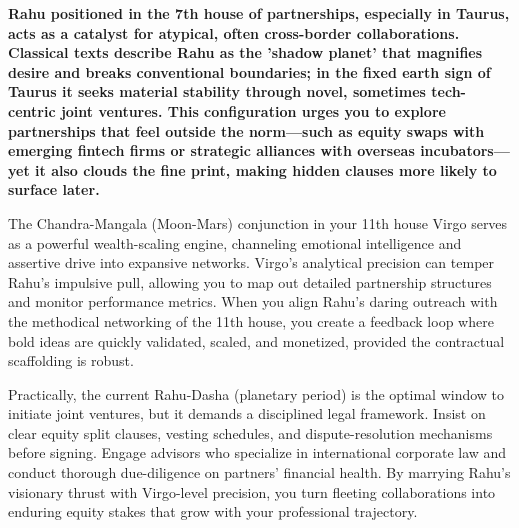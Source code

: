 \label{topic51}

{\fontsize{9.5}{13.8}\selectfont\bfseries\color{DeepSlate} Rahu positioned in the 7th house of partnerships, especially in Taurus, acts as a catalyst for atypical, often cross-border collaborations. Classical texts describe Rahu as the 'shadow planet' that magnifies desire and breaks conventional boundaries; in the fixed earth sign of Taurus it seeks material stability through novel, sometimes tech-centric joint ventures. This configuration urges you to explore partnerships that feel outside the norm---such as equity swaps with emerging fintech firms or strategic alliances with overseas incubators---yet it also clouds the fine print, making hidden clauses more likely to surface later.}\par\vspace{2mm}

{\fontsize{9}{13}\selectfont The Chandra-Mangala (Moon-Mars) conjunction in your 11th house Virgo serves as a powerful wealth-scaling engine, channeling emotional intelligence and assertive drive into expansive networks. Virgo's analytical precision can temper Rahu's impulsive pull, allowing you to map out detailed partnership structures and monitor performance metrics. When you align Rahu's daring outreach with the methodical networking of the 11th house, you create a feedback loop where bold ideas are quickly validated, scaled, and monetized, provided the contractual scaffolding is robust.}\par\vspace{1.8mm}

{\fontsize{9}{13}\selectfont Practically, the current Rahu-Dasha (planetary period) is the optimal window to initiate joint ventures, but it demands a disciplined legal framework. Insist on clear equity split clauses, vesting schedules, and dispute-resolution mechanisms before signing. Engage advisors who specialize in international corporate law and conduct thorough due-diligence on partners' financial health. By marrying Rahu's visionary thrust with Virgo-level precision, you turn fleeting collaborations into enduring equity stakes that grow with your professional trajectory.}\par\vspace{1.8mm}

